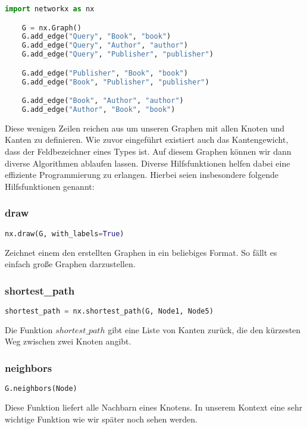 \begin{lstlisting}[language=Python]
    import networkx as nx

    G = nx.Graph()
    G.add_edge("Query", "Book", "book")
    G.add_edge("Query", "Author", "author")
    G.add_edge("Query", "Publisher", "publisher")

    G.add_edge("Publisher", "Book", "book")
    G.add_edge("Book", "Publisher", "publisher")

    G.add_edge("Book", "Author", "author")
    G.add_edge("Author", "Book", "book")
\end{lstlisting}

Diese wenigen Zeilen reichen aus um unseren Graphen mit allen Knoten und Kanten zu definieren.
Wie zuvor eingeführt existiert auch das Kantengewicht, dass der Feldbezeichner eines Types ist.
Auf diesem Graphen können wir dann diverse Algorithmen ablaufen lassen.
Diverse Hilfsfunktionen helfen dabei eine effiziente Programmierung zu erlangen.
Hierbei seien insbesondere folgende Hilfsfunktionen genannt:

\subsubsection{draw}
    \begin{lstlisting}[language=Python]
        nx.draw(G, with_labels=True)
    \end{lstlisting}

Zeichnet einem den erstellten Graphen in ein beliebiges Format.
So fällt es einfach große Graphen darzustellen.

\subsubsection{shortest\_path}
    \begin{lstlisting}[language=Python]
        shortest_path = nx.shortest_path(G, Node1, Node5)
    \end{lstlisting}

Die Funktion $shortest\_path$ gibt eine Liste von Kanten zurück, die den kürzesten Weg zwischen zwei
Knoten angibt.

\subsubsection{neighbors}
    \begin{lstlisting}[language=Python]
        G.neighbors(Node)
    \end{lstlisting}
Diese Funktion liefert alle Nachbarn eines Knotens.
In unserem Kontext eine sehr wichtige Funktion wie wir später noch sehen werden.

